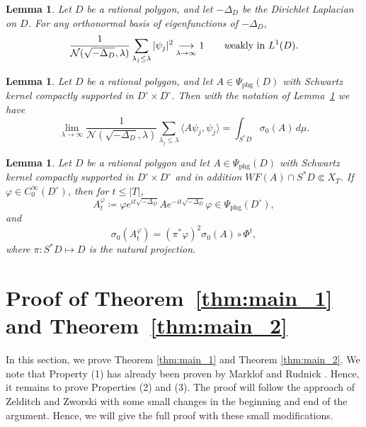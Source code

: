 \documentclass[11pt,twoside,reqno]{amsart}
\newcommand{\1}{\mathrm{\mathbf{1}}}
\numberwithin{equation}{section}
\theoremstyle{plain}
\newtheorem{lemma}[thm]{Lemma}
\theoremstyle{definition}
\theoremstyle{remark}
\begin{document}
\begin{lemma}\label{LE:weak_convergence}
    Let $D$ be a rational polygon, and let $-\Delta_D$ be the Dirichlet Laplacian on $D$. For any orthonormal basis of eigenfunctions of $-\Delta_D$,
    \begin{equation*}
        \frac{1}{\mathcal{N}(\sqrt{-\Delta_D},\lambda)} \sum_{\lambda_j\leq \lambda} |\psi_j|^2 \underset{\lambda \rightarrow \infty}{\longrightarrow} 1 \qquad \text{{\textit weakly in }} L^1(D).
    \end{equation*}
\end{lemma}

\begin{lemma}\label{LE:Weyl_law_gene}
     Let $D$ be a rational polygon, and let $A\in \Psi_{\mathrm{phg}}(D)$ with Schwartz kernel compactly supported in $D^{\circ}\times D^{\circ}$. Then with the notation of Lemma~\ref{LE:weak_convergence} we have
     \begin{equation*}
          \lim_{\lambda\rightarrow \infty}\frac{1}{\mathcal{N}(\sqrt{-\Delta_D},\lambda)} \sum_{\lambda_j\leq \lambda} \langle A\psi_j,\psi_j\rangle = \int_{S^{*}D} \sigma_0(A) \, d\mu.
     \end{equation*}
\end{lemma}

\begin{lemma}\label{LE:Egorov}
    Let $D$ be a rational polygon and let $A\in \Psi_{\mathrm{phg}}(D)$ with Schwartz kernel compactly supported in $D^{\circ}\times D^{\circ}$ and in addition $WF(A) \cap S^{*}D \Subset X_T$. If $\varphi \in C_0^\infty(D^{\circ})$, then for $t\leq |T|$,
    \begin{equation*}
        A_t^\varphi \coloneqq \varphi e^{it\sqrt{-\Delta_D}} A  e^{-it\sqrt{-\Delta_D}} \varphi \in \Psi_{\mathrm{phg}}(D^{\circ}),
    \end{equation*}
    and
    \begin{equation*}
        \sigma_0( A_t^\varphi) = (\pi^{*} \varphi)^2 \sigma_0(A)\circ \Phi^t,
    \end{equation*}
    where $\pi:S^*D \mapsto D$ is the natural projection.
\end{lemma}


\section{Proof of Theorem~\ref{thm:main_1} and Theorem~\ref{thm:main_2}}

In this section, we prove Theorem \ref{thm:main_1} and Theorem \ref{thm:main_2}. We note that Property (1) has already been proven by Marklof and Rudnick \cite{MR2879311}. Hence, it remains to prove Properties (2) and (3). The proof will follow the approach of Zelditch and Zworski \cite{ZZ96} with some small changes in the beginning and end of the argument. Hence, we will give the full proof with these small modifications.
\end{document}
